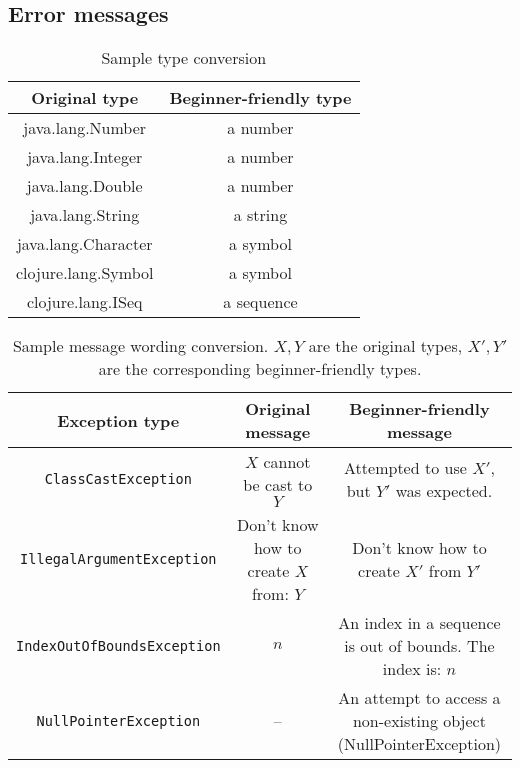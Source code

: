 \documentclass[submission,copyright,creativecommons]{eptcs}
\begin{document}
\subsection{Error messages}\label{subsec:errors}
\begin{table}[t]
\centering
\begin{tabular}{|c|c|}
\hline
Original type & Beginner-friendly type \\
\hline
java.lang.Number & a number \\
java.lang.Integer & a number \\
java.lang.Double  & a number \\
java.lang.String & a string \\
java.lang.Character & a symbol \\
clojure.lang.Symbol  & a symbol \\
clojure.lang.ISeq & a sequence \\
\hline
\end{tabular}
\caption{Sample type conversion}\label{table:types}
\end{table}
\begin{table}
\begin{tabular}{|c|c|c|}
\hline
Exception type & Original message & Beginner-friendly message \\
\hline 
{\tt ClassCastException} & $X$ cannot be cast to $Y$ & {\parbox{5cm}{Attempted to use $X'$, \\ 
but $Y'$ was expected.}} \\[0.3cm]
\hline
{\tt IllegalArgumentException} & 
Don't know how to create $X$ from:  $Y$ & 
{\parbox{5cm}{Don't know how to \\ create  $X'$ from $Y'$}} \\[0.3cm]
\hline
{\tt IndexOutOfBoundsException} & $n$ & {\parbox{5cm}{An index in a sequence \\ 
is out of bounds. The index is: $n$}} \\[0.3cm]
\hline
{\tt NullPointerException} & -- &  {\parbox{5cm}{An attempt to access a 
\\ non-existing object
\\ (NullPointerException)}} \\[0.3cm]
\hline
\end{tabular}
\caption{Sample message wording conversion. $X,Y$ are the original types, $X',Y'$ are the corresponding beginner-friendly types. }\label{table:messages}
\end{table}
\end{document}
